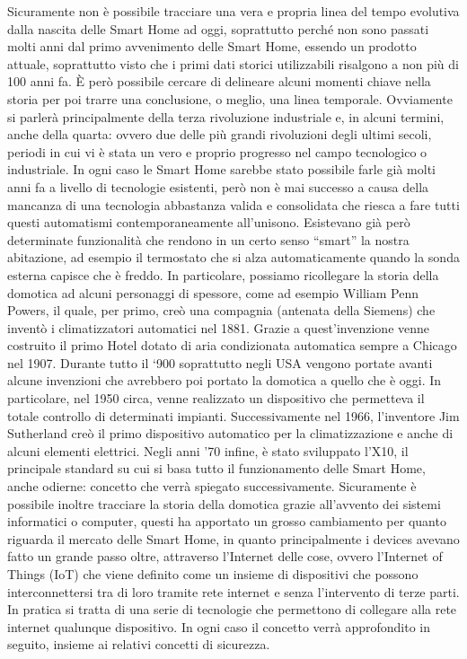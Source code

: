 Sicuramente non è possibile tracciare una vera e propria linea del tempo evolutiva dalla nascita delle Smart Home ad oggi, soprattutto perché non sono passati molti anni dal primo avvenimento delle Smart Home, essendo un prodotto attuale, soprattutto visto che i primi dati storici utilizzabili risalgono a non più di 100 anni fa.
È però possibile cercare di delineare alcuni momenti chiave nella storia per poi trarre una conclusione, o meglio, una linea temporale. Ovviamente si parlerà principalmente della terza rivoluzione industriale e, in alcuni termini, anche della quarta: ovvero due delle più grandi rivoluzioni degli ultimi secoli, periodi in cui vi è stata un vero e proprio progresso nel campo tecnologico o industriale. In ogni caso le Smart Home sarebbe stato possibile farle già molti anni fa a livello di tecnologie esistenti, però non è mai successo a causa della mancanza di una tecnologia abbastanza valida e consolidata che riesca a fare tutti questi automatismi contemporaneamente all’unisono. Esistevano già però determinate funzionalità che rendono in un certo senso “smart” la nostra abitazione, ad esempio il termostato che si alza automaticamente quando la sonda esterna capisce che è freddo.
In particolare, possiamo ricollegare la storia della domotica ad alcuni personaggi di spessore, come ad esempio William Penn Powers, il quale, per primo, creò una compagnia (antenata della Siemens) che inventò i climatizzatori automatici nel 1881. Grazie a quest’invenzione venne costruito il primo Hotel dotato di aria condizionata automatica sempre a Chicago nel 1907.
Durante tutto il ‘900 soprattutto negli USA vengono portate avanti alcune invenzioni che avrebbero poi portato la domotica a quello che è oggi. 
In particolare, nel 1950 circa, venne realizzato un dispositivo che permetteva il totale controllo di determinati impianti. Successivamente nel 1966, l’inventore Jim Sutherland creò il primo dispositivo automatico per la climatizzazione e anche di alcuni elementi elettrici. Negli anni ’70 infine, è stato sviluppato l’X10, il principale standard su cui si basa tutto il funzionamento delle Smart Home, anche odierne: concetto che verrà spiegato successivamente.
Sicuramente è possibile inoltre tracciare la storia della domotica grazie all’avvento dei sistemi informatici o computer, questi ha apportato un grosso cambiamento per quanto riguarda il mercato delle Smart Home, in quanto principalmente i devices avevano fatto un grande passo oltre, attraverso l’Internet delle cose, ovvero l’Internet of Things (IoT) che viene definito come un insieme di dispositivi che possono interconnettersi tra di loro tramite rete internet e senza l’intervento di terze parti. In pratica si tratta di una serie di tecnologie che permettono di collegare alla rete internet qualunque dispositivo.  In ogni caso il concetto verrà approfondito in seguito, insieme ai relativi concetti di sicurezza.
